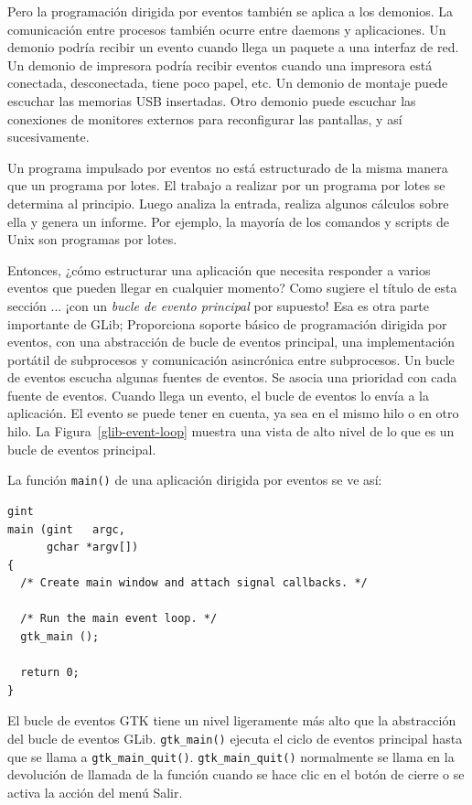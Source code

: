 Pero la programación dirigida por eventos también se aplica a los demonios. La comunicación entre procesos también ocurre entre daemons y aplicaciones. Un demonio podría recibir un evento cuando llega un paquete a una interfaz de red. Un demonio de impresora podría recibir eventos cuando una impresora está conectada, desconectada, tiene poco papel, etc. Un demonio de montaje puede escuchar las memorias USB insertadas. Otro demonio puede escuchar las conexiones de monitores externos para reconfigurar las pantallas, y así sucesivamente.

Un programa impulsado por eventos no está estructurado de la misma manera que un programa por lotes. El trabajo a realizar por un programa por lotes se determina al principio. Luego analiza la entrada, realiza algunos cálculos sobre ella y genera un informe. Por ejemplo, la mayoría de los comandos y scripts de Unix son programas por lotes.

Entonces, ¿cómo estructurar una aplicación que necesita responder a varios eventos que pueden llegar en cualquier momento? Como sugiere el título de esta sección ... ¡con un \emph{bucle de evento principal} por supuesto! Esa es otra parte importante de GLib; Proporciona soporte básico de programación dirigida por eventos, con una abstracción de bucle de eventos principal, una implementación portátil de subprocesos y comunicación asincrónica entre subprocesos. Un bucle de eventos escucha algunas fuentes de eventos. Se asocia una prioridad con cada fuente de eventos. Cuando llega un evento, el bucle de eventos lo envía a la aplicación. El evento se puede tener en cuenta, ya sea en el mismo hilo o en otro hilo. La Figura~\ref{glib-event-loop} muestra una vista de alto nivel de lo que es un bucle de eventos principal.

La función \lstinline{main()} de una aplicación dirigida por eventos se ve así:

\begin{lstlisting}[style=GLib/GTK]
gint
main (gint   argc,
      gchar *argv[])
{
  /* Create main window and attach signal callbacks. */

  /* Run the main event loop. */
  gtk_main ();

  return 0;
}
\end{lstlisting}

El bucle de eventos GTK tiene un nivel ligeramente más alto que la abstracción del bucle de eventos GLib. \lstinline{gtk_main()} ejecuta el ciclo de eventos principal hasta que se llama a \lstinline{gtk_main_quit()}. \lstinline{gtk_main_quit()} normalmente se llama en la devolución de llamada de la función cuando se hace clic en el botón de cierre o se activa la acción del menú Salir.


